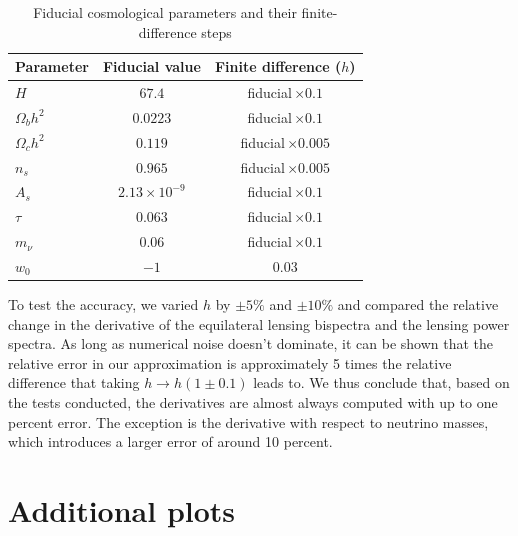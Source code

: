 \documentclass[11pt]{article} %
\begin{document}
\begin{table}[!]
    \centering
    \begin{tabular}{|l|c|c|}
    \hline
    Parameter & Fiducial value & Finite difference ($h$) \\
    \hline
    $H$            & $67.4$               & fiducial\,$\times0.1$   \\
    $\Omega_b h^2$ & $0.0223$             & fiducial\,$\times0.1$   \\
    $\Omega_c h^2$ & $0.119$              & fiducial\,$\times0.005$ \\
    $n_s$          & $0.965$              & fiducial\,$\times0.005$ \\
    $A_s$          & $2.13\times10^{-9}$  & fiducial\,$\times0.1$   \\
    $\tau$         & $0.063$              & fiducial\,$\times 0.1$   \\
    $m_\nu$        & $0.06$               & fiducial\,$\times0.1$   \\
    $w_0$          & $-1$                 & $0.03$                  \\
    \hline
    \end{tabular}
    \caption{Fiducial cosmological parameters and their finite-difference steps}
    \label{tab:cosmo-params-diff}
\end{table}
    
    

To test the accuracy, we varied $h$ by $\pm 5\%$ and $\pm 10\%$ and compared the relative change in the derivative of the equilateral lensing bispectra and the lensing power spectra. As long as numerical noise doesn't dominate, it can be shown that the relative error in our approximation is approximately 5 times the relative difference that taking $h \rightarrow h(1 \pm 0.1)$ leads to. We thus conclude that, based on the tests conducted, the derivatives are almost always computed with up to one percent error. The exception is the derivative with respect to neutrino masses, which introduces a larger error of around 10 percent.

\pagebreak
\section{Additional plots}
\label{sec:lambdacdmconstraints}
\end{document}
